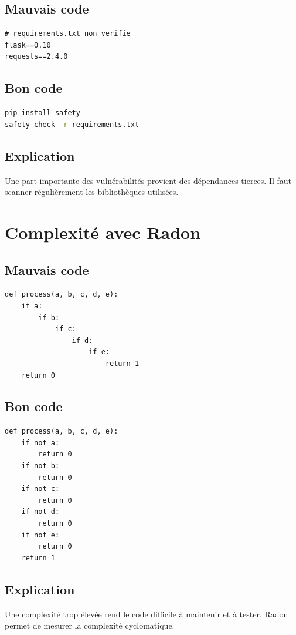 \documentclass[a4paper,11pt]{report}
\begin{document}
\section{Mauvais code}
\begin{lstlisting}
# requirements.txt non verifie
flask==0.10
requests==2.4.0
\end{lstlisting}

\section{Bon code}
\begin{lstlisting}[language=bash]
pip install safety
safety check -r requirements.txt
\end{lstlisting}

\section{Explication}
Une part importante des vulnérabilités provient des dépendances tierces.
Il faut scanner régulièrement les bibliothèques utilisées.

\chapter{Complexité avec Radon}

\section{Mauvais code}
\begin{lstlisting}
def process(a, b, c, d, e):
    if a:
        if b:
            if c:
                if d:
                    if e:
                        return 1
    return 0
\end{lstlisting}

\section{Bon code}
\begin{lstlisting}
def process(a, b, c, d, e):
    if not a:
        return 0
    if not b:
        return 0
    if not c:
        return 0
    if not d:
        return 0
    if not e:
        return 0
    return 1
\end{lstlisting}

\section{Explication}
Une complexité trop élevée rend le code difficile à maintenir et à tester.
Radon permet de mesurer la complexité cyclomatique.
\end{document}
